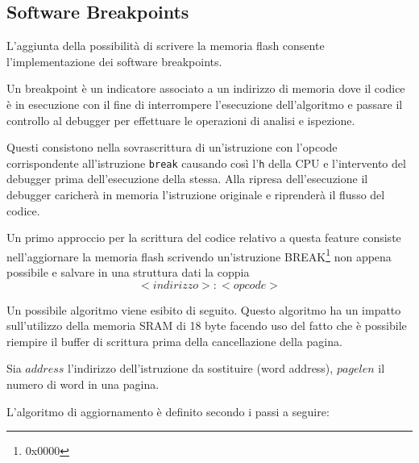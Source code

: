 \subsection{Software Breakpoints}

L'aggiunta della possibilità di scrivere la memoria flash consente l'implementazione dei software breakpoints.

Un breakpoint è un indicatore associato a un indirizzo di memoria dove il codice è in esecuzione con il fine di interrompere l'esecuzione dell'algoritmo e passare il controllo al debugger per effettuare le operazioni di analisi e ispezione.

Questi consistono nella sovrascrittura di un'istruzione con l'opcode corrispondente all'istruzione \texttt{break} causando così l'\texttt{h} della CPU e l'intervento del debugger prima dell'esecuzione della stessa.
Alla ripresa dell'esecuzione il debugger caricherà in memoria l'istruzione originale e riprenderà il flusso del codice.

Un primo approccio per la scrittura del codice relativo a questa feature consiste nell'aggiornare la memoria flash scrivendo un'istruzione BREAK\footnote{0x0000} non appena possibile e salvare in una struttura dati la coppia \[<indirizzo>:<opcode>\]

Un possibile algoritmo viene esibito di seguito. Questo algoritmo ha un impatto sull'utilizzo della memoria SRAM di 18 byte facendo uso del fatto che è possibile riempire il buffer di scrittura prima della cancellazione della pagina\cite{avr:m328p}.

Sia \(address\) l'indirizzo dell'istruzione da sostituire (word address), \(pagelen\) il numero di word in una pagina.

L'algoritmo di aggiornamento è definito secondo i passi a seguire:

